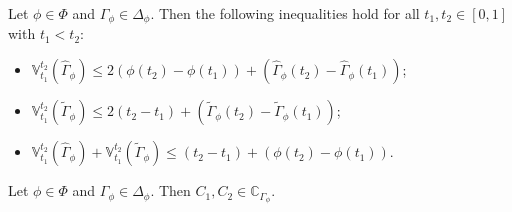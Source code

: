 \documentclass[10pt,a4paper]{amsart}
\begin{document}
\begin{lemm}\label{lemm-evofTV}
Let $\phi\in\Phi$ and $\Gamma_\phi\in\Delta_\phi$. Then the following inequalities hold for all $t_1, t_2\in[0, 1]$ with $t_1<t_2$:
\begin{itemize}\setlength{\itemindent}{10pt}
\item[{\rm (i)}] $\mathbb{V}_{t_1}^{t_2}(\hat{\Gamma}_\phi)\leq 2(\phi(t_2)-\phi(t_1))+ (\hat{\Gamma}_\phi(t_2)-\hat{\Gamma}_\phi(t_1))$;
\item[{\rm (ii)}] $\mathbb{V}_{t_1}^{t_2}(\tilde{\Gamma}_\phi)\leq 2(t_2-t_1)+(\tilde{\Gamma}_\phi(t_2)-\tilde{\Gamma}_\phi(t_1))$;
\item[{\rm (iii)}] $\mathbb{V}_{t_1}^{t_2}(\hat{\Gamma}_\phi)+ \mathbb{V}_{t_1}^{t_2}(\tilde{\Gamma}_\phi)\leq (t_2-t_1)+ (\phi(t_2)-\phi(t_1))$.
\end{itemize}
\end{lemm}

\begin{thrm}
Let $\phi\in\Phi$ and $\Gamma_\phi\in\Delta_\phi$. Then $C_1, C_2\in\mathbb{C}_{\Gamma_\phi}$.
\end{thrm}
\end{document}
